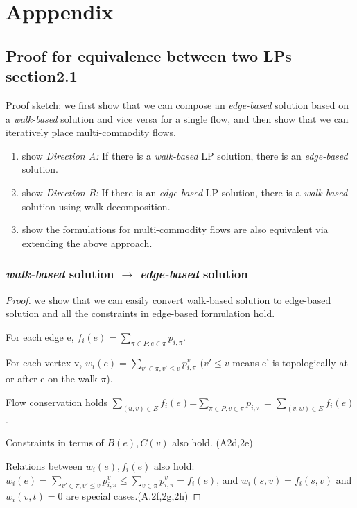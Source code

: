 \appendix
\section{Apppendix}
\subsection{Proof for equivalence between two LPs section2.1} \label{subsec:lppaths}
Proof sketch: we first show that we can compose an \emph{edge-based} solution based on a \emph{walk-based} solution and vice versa for a single flow, and then show that we can iteratively place multi-commodity flows. 
\begin{enumerate}
\item show \emph{Direction A:} If there is a \emph{walk-based} LP solution, there is an \emph{edge-based} solution.
\item show \emph{Direction B:} If there is an \emph{edge-based} LP solution, there is a \emph{walk-based} solution using walk decomposition.
\item show the formulations for multi-commodity flows are also equivalent via extending the above approach.
\end{enumerate}

\subsubsection{\emph{walk-based} solution $\rightarrow$ \emph{edge-based} solution}
\begin{proof}
we show that we can easily convert walk-based solution to edge-based solution and all the constraints in edge-based formulation hold.

For each edge e, $f_i(e) =\sum\limits_{\pi\in P: e\in \pi} p_{i,\pi}$.

For each vertex v, $w_i(e) =  \sum\limits_{v'\in \pi, v' \leq v} p_{i,\pi}^v$ ($v'\leq v$ means e' is topologically at or after e on the walk $\pi$). 

Flow conservation holds $ \sum\limits_{(u,v)\in E} f_i(e) $=$ \sum\limits_{\pi\in P, v\in \pi} p_{i, \pi}$ = $\sum\limits_{(v,w )\in E} f_i(e)$. 

Constraints in terms of $B(e), C(v)$ also hold. (A2d,2e)

Relations between $w_i(e), f_i(e)$ also hold: $w_i(e)=  \sum\limits_{v'\in \pi, v' \leq v} p_{i,\pi}^v \leq \sum \limits_{v\in \pi} p_{i,\pi}^v = f_i(e) $, and $w_i(s,v)=f_i(s,v)$ and $w_i(v,t)=0$ are special cases.(A.2f,2g,2h)

\end{proof}

